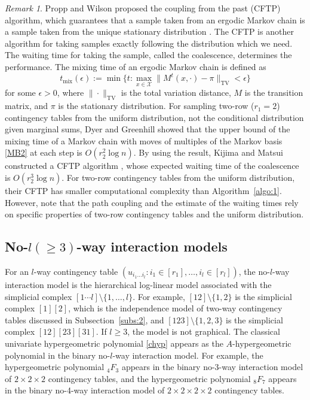 \documentclass[a4paper,12pt]{article}
\theoremstyle{plain}
\theoremstyle{remark}
\newtheorem{remark}[theorem]{Remark}
\begin{document}
\begin{remark}\label{rema:mixing}
  Propp and Wilson proposed the coupling from the past (CFTP)
  algorithm, which guarantees that a sample taken from
  an ergodic Markov chain is a sample taken from the unique
  stationary distribution \cite{PW96}. The CFTP is another
  algorithm for taking samples exactly following the distribution
  which we need. The waiting time for taking the sample,
  called the coalescence, determines the performance. 
  The mixing time of an ergodic Markov chain is defined as
  \[
    t_{\text{mix}}(\epsilon):=\min\{t:
    \max_{x\in\mathcal{X}}\|M^t(x,\cdot)-\pi\|_{\text{TV}}<\epsilon\}
  \]
  for some $\epsilon>0$, where $\|\cdot \|_{\text{TV}}$ is
  the total variation distance, $M$ is the transition matrix,
  and $\pi$ is the stationary distribution. For sampling
  two-row ($r_1=2$) contingency tables from the uniform
  distribution, not the conditional distribution given
  marginal sums, Dyer and Greenhill \cite{DG00} showed that
  the upper bound of the mixing time of a Markov chain with
  moves of multiples of the Markov basis \eqref{MB2} at each
  step is $O(r_2^2\log n)$. By using the result, Kijima and
  Matsui \cite{KM06} constructed a CFTP algorithm
  \cite{PW96}, whose expected waiting time of the coalescence
  is $O(r_2^3\log n)$. For two-row contingency tables from
  the uniform distribution, their CFTP has smaller computational
  complexity than Algorithm~\ref{algo:1}. However, note that
  the path coupling and the estimate of the waiting times
  rely on specific properties of two-row contingency
  tables and the uniform distribution.
\end{remark}

\subsection{No-$l(\ge 3)$-way interaction models}

For an $l$-way contingency table
$(u_{i_1\ldots i_l}:i_1\in[r_1],\ldots,i_l\in[r_l])$,
the no-$l$-way interaction model is the hierarchical
log-linear model associated with the simplicial complex
$[1\cdots l]\setminus\{1,\ldots,l\}$. For example,
$[12]\setminus\{1,2\}$ is the simplicial complex $[1][2]$,
which is the independence model of two-way contingency
tables discussed in Subsection~\ref{subs:2}, and
$[123]\setminus\{1,2,3\}$ is the simplicial complex
$[12][23][31]$. If $l\ge 3$, the model is not graphical.
The classical univariate hypergeometric
polynomial \eqref{chyp} appears as the $A$-hypergeometric
polynomial in the binary no-$l$-way interaction model. 
For example, the hypergeometric polynomial $_4F_3$
appears in the binary no-3-way interaction model of
$2\times2\times2$ contingency tables, and the hypergeometric
polynomial $_8F_7$ appears in the binary no-4-way
interaction model of $2\times2\times2\times2$ contingency
tables.
\end{document}
